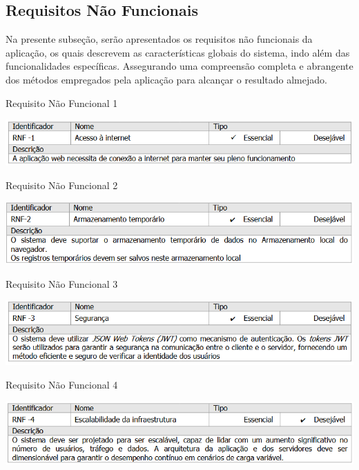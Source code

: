 \subsection{Requisitos Não Funcionais}
Na presente subseção, serão apresentados os requisitos não funcionais da aplicação, os quais descrevem as características globais do sistema, indo além das funcionalidades específicas.
Assegurando uma compreensão completa e abrangente dos métodos empregados pela aplicação para alcançar o resultado almejado.

\begin{table}[H]
    \caption{Requisito Não Funcional 1}\label{tab:rnf1}
    \centering
    \includegraphics[scale=0.82]{imagens/rnf1.png}
\end{table}
\begin{table}[H]
    \caption{Requisito Não Funcional 2}\label{tab:rnf2}
    \centering
    \includegraphics[scale=0.82]{imagens/rnf2.png}
\end{table}
\begin{table}[H]
    \caption{Requisito Não Funcional 3}\label{tab:rnf3}
    \centering
    \includegraphics[scale=0.82]{imagens/rnf3.png}
\end{table}
\begin{table}[H]
    \caption{Requisito Não Funcional 4}\label{tab:rnf4}
    \centering
    \includegraphics[scale=0.82]{imagens/rnf4.png}
\end{table}
